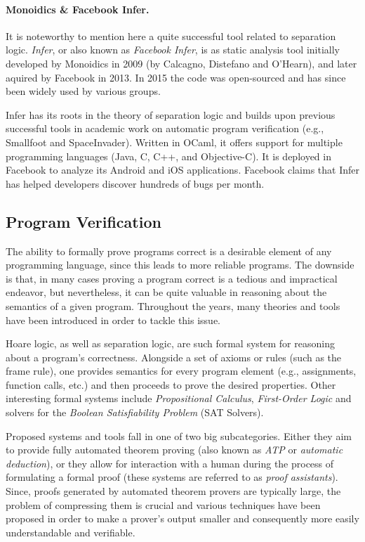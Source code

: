 \paragraph{Monoidics \& Facebook Infer.}
It is noteworthy to mention here a quite successful tool related to separation logic. \emph{Infer}, or also known as \emph{Facebook Infer}, is as static analysis tool initially developed by Monoidics in 2009 (by Calcagno, Distefano and O'Hearn), and later aquired by Facebook in 2013. In 2015 the code was open-sourced and has since been widely used by various groups.

Infer has its roots in the theory of separation logic and builds upon previous successful tools in academic work on automatic program verification (e.g., Smallfoot and SpaceInvader). Written in OCaml, it offers support for multiple programming languages (Java, C, C++, and Objective-C). It is deployed in Facebook to analyze its Android and iOS applications. Facebook claims that Infer has helped developers discover hundreds of bugs per month.


\subsection{Program Verification}

The ability to formally prove programs correct is a desirable element of any programming language, since this leads to more reliable programs. The downside is that, in many cases proving a program correct is a tedious and impractical endeavor, but nevertheless, it can be quite valuable in reasoning about the semantics of a given program. Throughout the years, many theories and tools have been introduced in order to tackle this issue.

Hoare logic, as well as separation logic, are such formal system for reasoning about a program's correctness. Alongside a set of axioms or rules (such as the frame rule), one provides semantics for every program element (e.g., assignments, function calls, etc.) and then proceeds to prove the desired properties. Other interesting formal systems include \emph{Propositional Calculus}, \emph{First-Order Logic} and solvers for the \emph{Boolean Satisfiability Problem} (SAT Solvers).

Proposed systems and tools fall in one of two big subcategories. Either they aim to provide fully automated theorem proving (also known as \emph{ATP} or \emph{automatic deduction}), or they allow for interaction with a human during the process of formulating a formal proof (these systems are referred to as \emph{proof assistants}). Since, proofs generated by automated theorem provers are typically large, the problem of compressing them is crucial and various techniques have been proposed in order to make a prover's output smaller and consequently more easily understandable and verifiable. \todo{}


